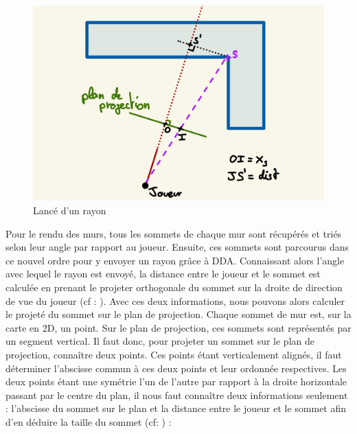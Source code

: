 \documentclass[11pt]{article}
\begin{document}
\begin{figure}
	\begin{minipage}{\textwidth}
		\includegraphics[width=\linewidth]{image/shemaLanceRayon01.jpeg}
		\hspace*{-0.5cm}
		\caption{Lancé d'un rayon}
		\label{fig:shemaLanceRayon01}
	\end{minipage}
\end{figure}


Pour le rendu des murs, tous les sommets de chaque mur sont récupérés et triés selon leur angle par rapport au joueur.
Ensuite, ces sommets sont parcourus dans ce nouvel ordre pour y envoyer un rayon grâce à DDA. Connaissant alors l'angle
avec lequel le rayon est envoyé, la distance entre le joueur et le sommet est calculée en prenant le projeter orthogonale
du sommet sur la droite de direction de vue du joueur (cf : ). Avec ces deux informations, nous pouvons alors calculer le projeté
du sommet sur le plan de projection. Chaque sommet de mur est, sur la carte en 2D, un point. Sur le plan de projection, 
ces sommets sont représentés par un segment vertical. Il faut donc, pour projeter un sommet sur le plan de projection, connaître
deux points. Ces points étant verticalement alignés, il faut déterminer l'abscisse commun à ces deux points et leur ordonnée 
respectives. Les deux points étant une symétrie l'un de l'autre par rapport à la droite horizontale passant par le centre du plan,
il nous faut connaître deux informations seulement : l'abscisse du sommet sur le plan et la distance entre le joueur et le sommet
afin d'en déduire la taille du sommet (cf: ) : \\
\end{document}
